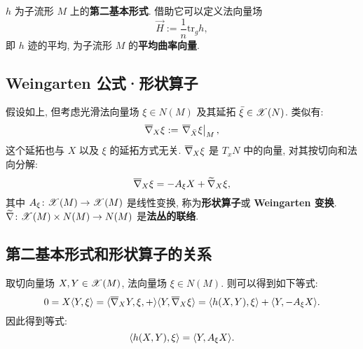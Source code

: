 \begin{definition}
	$h$ 为子流形 $M$ 上的{\bf 第二基本形式}. 借助它可以定义法向量场
	\begin{equation}\label{eq::mean-curvature-vector-def}
		\overrightarrow{H} := \dfrac{1}{n}\mathrm{tr}_{g}h,
	\end{equation}
	即 $h$ 迹的平均, 为子流形 $M$ 的{\bf 平均曲率向量}.
\end{definition}

\subsection{Weingarten 公式·形状算子}
假设如上, 但考虑光滑法向量场 $\xi \in N(M)$ 及其延拓 $\bar{\xi} \in \mathscr{X}(N)$. 类似有:
\begin{equation*}
	\overline{\nabla}_{X}{\xi} := \left.\overline{\nabla}_{\bar{X}}{\xi}\right|_{M},
\end{equation*}
这个延拓也与 $X$ 以及 $\xi$ 的延拓方式无关. $\overline{\nabla}_{X}{\xi}$ 是 $T_xN$ 中的向量, 对其按切向和法向分解:
\begin{equation}\label{eq::Weingarten-formula}
	\overline{\nabla}_{X}{\xi} = -A_{\xi}X + \widetilde{\nabla}_{X}{\xi},
\end{equation}
其中 $A_{\xi} \colon \mathscr{X}(M) \rightarrow \mathscr{X}(M)$ 是线性变换, 称为{\bf 形状算子}或 {\bf Weingarten 变换}. $\widetilde{\nabla} \colon \mathscr{X}(M) \times N(M) \rightarrow N(M)$ 是{\bf 法丛的联络}.

\subsection{第二基本形式和形状算子的关系}
取切向量场 $X, Y \in \mathscr{X}(M)$, 法向量场 $\xi \in N(M)$. 则可以得到如下等式:
\begin{equation*}
	0 = X\langle {Y}, {\xi} \rangle = \langle {\overline{\nabla}_{X}{Y}, \xi}, {+} \rangle \langle {Y}, {\overline{\nabla}_{X}{\xi}} \rangle = \langle {h(X, Y)}, {\xi} \rangle + \langle {Y}, {-A_{\xi}X} \rangle.
\end{equation*}
因此得到等式:
\begin{equation}
	\langle {h(X, Y)}, {\xi} \rangle = \langle {Y}, {A_{\xi}{X}} \rangle.
\end{equation}